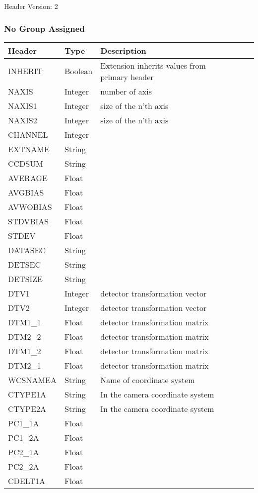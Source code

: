 Header Version: 2

\subsubsection{No Group Assigned}


\begin{tabular}{l l l l l}
\hline
Header & Type & Description \\
\hline
INHERIT & Boolean & Extension inherits values from primary header \\
NAXIS & Integer & number of axis \\
NAXIS1 & Integer & size of the n'th axis \\
NAXIS2 & Integer & size of the n'th axis \\
CHANNEL & Integer &  \\
EXTNAME & String &  \\
CCDSUM & String &  \\
AVERAGE & Float &  \\
AVGBIAS & Float &  \\
AVWOBIAS & Float &  \\
STDVBIAS & Float &  \\
STDEV & Float &  \\
DATASEC & String &  \\
DETSEC & String &  \\
DETSIZE & String &  \\
DTV1 & Integer & detector transformation vector \\
DTV2 & Integer & detector transformation vector \\
DTM1\_1 & Float & detector transformation matrix \\
DTM2\_2 & Float & detector transformation matrix \\
DTM1\_2 & Float & detector transformation matrix \\
DTM2\_1 & Float & detector transformation matrix \\
WCSNAMEA & String & Name of coordinate system \\
CTYPE1A & String & In the camera coordinate system \\
CTYPE2A & String & In the camera coordinate system \\
PC1\_1A & Float &  \\
PC1\_2A & Float &  \\
PC2\_1A & Float &  \\
PC2\_2A & Float &  \\
CDELT1A & Float &  \\

\end{tabular}
